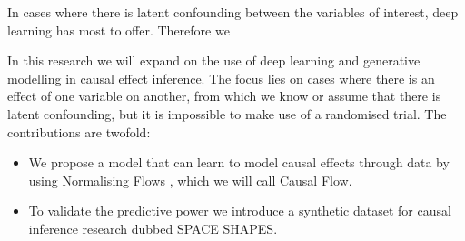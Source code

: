 \documentclass{report}
\newcommand{\bx}{\mathbf{x}}
\newcommand{\bZ}{\mathbf{Z}}
\begin{document}
In cases where there is latent confounding between the variables of interest, deep learning has most to offer. Therefore we 

In this research we will expand on the use of deep learning and generative modelling in causal effect inference. The focus lies on cases where there is an effect of one variable on another, from which we know or assume that there is latent confounding, but it is impossible to make use of a randomised trial. The contributions are twofold:
\begin{itemize}
    \item We propose a model that can learn to model causal effects through data by using Normalising Flows \cite{rezende2016variational}, which we will call Causal Flow.
    \item To validate the predictive power we introduce a synthetic dataset for causal inference research dubbed SPACE SHAPES.
\end{itemize}





\end{document}

